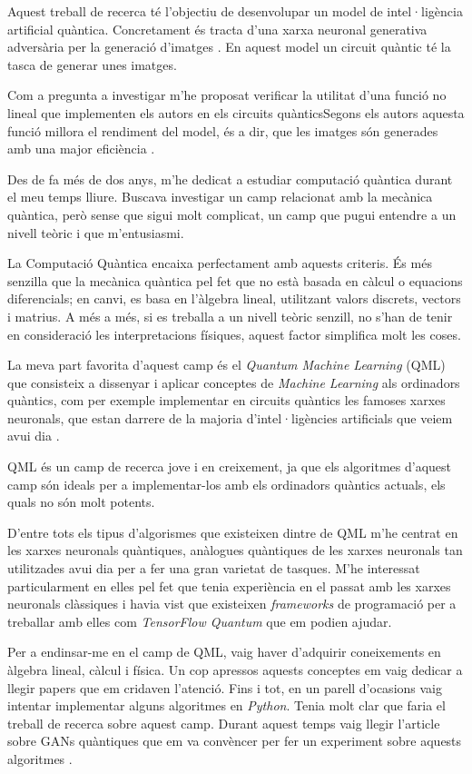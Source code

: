 Aquest treball de recerca té l'objectiu de desenvolupar un model de intel·ligència artificial quàntica. Concretament és tracta d'una xarxa neuronal generativa adversària per la generació d'imatges \cite{QGAN_exp, GAN2014}. En aquest model un circuit quàntic té la tasca de generar unes imatges. 

Com a pregunta a investigar m'he proposat verificar la utilitat d'una funció no lineal que implementen els autors en els circuits quànticsSegons els autors aquesta funció millora el rendiment del model, és a dir, que les imatges són generades amb una major eficiència \cite{QGAN_exp}.

Des de fa més de dos anys, m'he dedicat a estudiar computació quàntica durant el meu temps lliure. Buscava investigar un camp relacionat amb la mecànica quàntica, però sense que sigui molt complicat, un camp que pugui entendre a un nivell teòric i que m'entusiasmi.

La Computació Quàntica encaixa perfectament amb aquests criteris. És més senzilla que la mecànica quàntica pel fet que no està basada en càlcul o equacions diferencials; en canvi, es basa en l'àlgebra lineal, utilitzant valors discrets, vectors i matrius. A més a més, si es treballa a un nivell teòric senzill, no s'han de tenir en consideració les interpretacions físiques, aquest factor simplifica molt les coses.

La meva part favorita d'aquest camp és el \textit{Quantum Machine Learning} (QML) que consisteix a dissenyar i aplicar conceptes de \textit{Machine Learning} als ordinadors quàntics, com per exemple implementar en circuits quàntics les famoses xarxes neuronals, que estan darrere de la majoria d'intel·ligències artificials que veiem avui dia \cite{schuld:2014}.

QML és un camp de recerca jove i en creixement, ja que els algoritmes d'aquest camp són ideals per a implementar-los amb els ordinadors quàntics actuals, els quals no són molt potents.

D'entre tots els tipus d'algorismes que existeixen dintre de QML m'he centrat en les xarxes neuronals quàntiques, anàlogues quàntiques de les xarxes neuronals tan utilitzades avui dia per a fer una gran varietat de tasques. M'he interessat particularment en elles pel fet que tenia experiència en el passat amb les xarxes neuronals clàssiques i havia vist que existeixen \textit{frameworks} de programació per a treballar amb elles com \textit{TensorFlow Quantum} \cite{tfq} que em podien ajudar.

Per a endinsar-me en el camp de QML, vaig haver d'adquirir coneixements en àlgebra lineal, càlcul i física. Un cop apressos aquests conceptes em vaig dedicar a llegir papers que em cridaven l'atenció. Fins i tot, en un parell d'ocasions vaig intentar implementar alguns algoritmes en \textit{Python}. Tenia molt clar que faria el treball de recerca sobre aquest camp. Durant aquest temps vaig llegir l'article sobre GANs quàntiques que em va convèncer per fer un experiment sobre aquests algoritmes \cite{QGAN_exp}.




